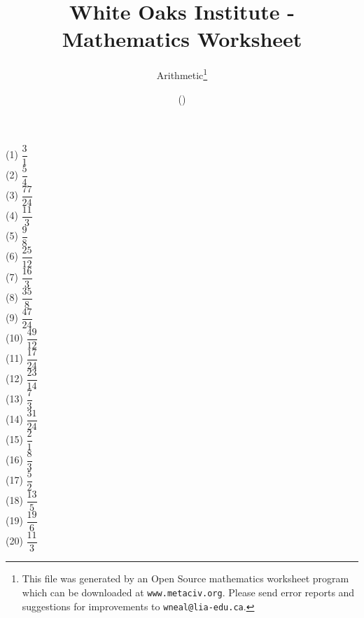 \documentclass[letter]{article}
\begin{document}
\title{White Oaks Institute - Mathematics Worksheet}
\author{Arithmetic\thanks{This file was generated by an \textsf{Open Source} mathematics worksheet program which can be downloaded at \texttt{www.metaciv.org}. Please send error reports and suggestions for improvements to \texttt{wneal@lia-edu.ca}.}}
\date{\XCfileversion{} (\XCfiledate)}
\maketitle
\setlength{\parskip}{12mm plus 4mm minus 4mm}\setlength{\parindent}{0cm}\begin{multicols}{2}(1) $\dfrac{3}{1}$\\(2) $\dfrac{5}{4}$\\(3) $\dfrac{77}{24}$\\(4) $\dfrac{11}{3}$\\(5) $\dfrac{9}{8}$\\(6) $\dfrac{25}{12}$\\(7) $\dfrac{16}{3}$\\(8) $\dfrac{35}{8}$\\(9) $\dfrac{47}{24}$\\(10) $\dfrac{49}{12}$\\(11) $\dfrac{17}{24}$\\(12) $\dfrac{23}{14}$\\(13) $\dfrac{7}{3}$\\(14) $\dfrac{31}{24}$\\(15) $\dfrac{2}{1}$\\(16) $\dfrac{8}{3}$\\(17) $\dfrac{5}{2}$\\(18) $\dfrac{13}{5}$\\(19) $\dfrac{19}{6}$\\(20) $\dfrac{11}{3}$\\\end{multicols}
\end{document}
